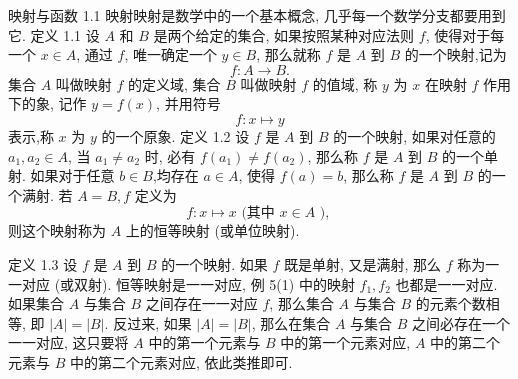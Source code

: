 
映射与函数
1.1 映射映射是数学中的一个基本概念, 几乎每一个数学分支都要用到它.
定义 1.1 设 $A$ 和 $B$ 是两个给定的集合, 如果按照某种对应法则 $f$, 使得对于每一个 $x \in A$, 通过 $f$, 唯一确定一个 $y \in B$, 那么就称 $f$ 是 $A$ 到 $B$ 的一个映射,记为
$$
f: A \rightarrow B .
$$
集合 $A$ 叫做映射 $f$ 的定义域, 集合 $B$ 叫做映射 $f$ 的值域, 称 $y$ 为 $x$ 在映射 $f$ 作用下的象, 记作 $y=f(x)$, 并用符号
$$
f: x \mapsto y
$$
表示,称 $x$ 为 $y$ 的一个原象.
定义 1.2 设 $f$ 是 $A$ 到 $B$ 的一个映射, 如果对任意的 $a_1, a_2 \in A$, 当 $a_1 \neq a_2$ 时, 必有 $f\left(a_1\right) \neq f\left(a_2\right)$, 那么称 $f$ 是 $A$ 到 $B$ 的一个单射.
如果对于任意 $b \in B$,均存在 $a \in A$, 使得 $f(a)=b$, 那么称 $f$ 是 $A$ 到 $B$ 的一个满射.
若 $A=B, f$ 定义为
$$
f: x \mapsto x \text { (其中 } x \in A \text { ), }
$$
则这个映射称为 $A$ 上的恒等映射 (或单位映射).



定义 1.3 设 $f$ 是 $A$ 到 $B$ 的一个映射.
如果 $f$ 既是单射, 又是满射, 那么 $f$ 称为一一对应 (或双射).
恒等映射是一一对应, 例 5(1) 中的映射 $f_1, f_2$ 也都是一一对应.
如果集合 $A$ 与集合 $B$ 之间存在一一对应 $f$, 那么集合 $A$ 与集合 $B$ 的元素个数相等, 即 $|A|=|B|$.
反过来, 如果 $|A|=|B|$, 那么在集合 $A$ 与集合 $B$ 之间必存在一个一一对应, 这只要将 $A$ 中的第一个元素与 $B$ 中的第一个元素对应, $A$ 中的第二个元素与 $B$ 中的第二个元素对应, 依此类推即可.



